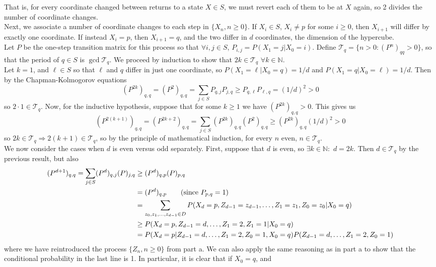 \documentclass[11pt, letterpaper]{article}
\newcommand{\mbb}[1]{\mathbb{#1}}
\newcommand{\mc}[1]{\mathcal{#1}}
\begin{document}
    That is, for every coordinate changed between returns to a state $X\in S$, we must revert each of them to be at $X$ again, so 2 divides the number of coordinate changes.\\[10pt]
    Next, we associate a number of coordinate changes to each step in $\{X_n,n\geq 0\}$. If $X_i\in S$, $X_i\neq p$ for some $i\geq 0$, then $X_{i+1}$ will differ by
    exactly one coordinate. If instead $X_i=p$, then $X_{i+1}=q$, and the two differ in $d$ coordinates, the dimension of the hypercube.\\[10pt]
    Let $P$ be the one-step transition matrix for this process so that $\forall i,j\in S$, $P_{i,j}=P(X_1=j|X_0=i)$. Define $\mc{T}_q=\{n>0:(P^n)_{qq}>0\}$, so that the period of $q\in S$ is $\gcd\mc{T}_q$. We proceed by induction to show that $2k\in\mc{T}_q$ $\forall k\in\mbb{N}$.\\[10pt]
    Let $k=1$, and $\ell\in S$ so that $\ell$ and $q$ differ in just one coordinate, so $P(X_1=\ell|X_0=q)=1/d$ and $P(X_1=q|X_0=\ell)=1/d$. Then by the Chapman-Kolmogorov equations
    \[(P^{2k})_{q,q}=(P^2)_{q,q}=\sum_{j\in S}P_{q,j}P_{j,q}\geq P_{q,\ell}P_{\ell,q}=(1/d)^2>0\]
    so $2\cdot1\in\mc{T}_q$. Now, for the inductive hypothesis, suppose that for some $k\geq 1$ we have $(P^{2k})_{q,q}>0$. This gives us
    \[(P^{2(k+1)})_{q,q}=(P^{2k+2})_{q,q}=\sum_{j\in S}(P^{2k})_{q,q}(P^2)_{q,q}\geq(P^{2k})_{q,q}(1/d)^2>0\]
    so $2k\in\mc{T}_q\Rightarrow 2(k+1)\in\mc{T}_q$, so by the principle of mathematical induction, for every $n$ even, $n\in\mc{T}_q$.\\[10pt]
    We now consider the cases when $d$ is even versus odd separately. First, suppose that $d$ is even, so $\exists k\in\mbb{N}:$ $d=2k$. Then $d\in\mc{T}_q$ by the previous result, but also
    \begin{align*}
        (P^{d+1})_{q,q}=\sum_{j\in S}(P^d)_{q,j}(P)_{j,q}&\geq(P^d)_{q,p}(P)_{p,q}\\
        &=(P^d)_{q,p}\tag{since $P_{p,q}=1$}\\
        &=\sum_{z_0,z_1,\dots,z_{d-1}\in D}P(X_d=p,Z_{d-1}=z_{d-1},\dots,Z_1=z_1,Z_0=z_0|X_0=q)\\
        &\geq P(X_d=p,Z_{d-1}=d,\dots,Z_1=2,Z_1=1|X_0=q)\\
        &=P(X_d=p|Z_{d-1}=d,\dots,Z_1=2,Z_0=1,X_0=q)P(Z_{d-1}=d,\dots,Z_1=2,Z_0=1)
    \end{align*} 
    where we have reintroduced the process $\{Z_n,n\geq0\}$ from part a. We can also apply the same reasoning as in part a to show that the conditional probability in the last line is 1. In particular, it is clear that if $X_0=q$, and
\end{document}
